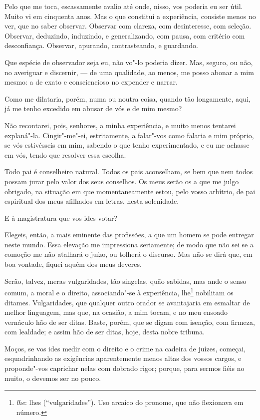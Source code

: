 Pelo que me toca, escassamente avalio até onde, nisso, vos poderia
eu ser útil. Muito vi em cinquenta anos. Mas o que constitui a
experiência, consiste menos no ver, que no saber observar. Observar com
clareza, com desinteresse, com seleção. Observar, deduzindo, induzindo,
e generalizando, com pausa, com critério com desconfiança. Observar,
apurando, contrasteando, e guardando.

Que espécie de observador seja eu, não vo"-lo poderia dizer. Mas,
seguro, ou não, no averiguar e discernir, --- de uma qualidade, ao menos,
me posso abonar a mim mesmo: a de exato e consciencioso no expender e narrar.

Como me dilataria, porém, numa ou noutra coisa, quando tão
longamente, aqui, já me tenho excedido em abusar de vós e de mim mesmo?

Não recontarei, pois, senhores, a minha experiência, e muito menos
tentarei explaná"-la. Cingir"-me"-ei, estritamente, a falar"-vos como
falaria e mim próprio, se vós estivésseis em mim, sabendo o que tenho
experimentado, e eu me achasse em vós, tendo que resolver essa escolha.

Todo pai é conselheiro natural. Todos os pais aconselham, se bem
que nem todos possam jurar pelo valor dos seus conselhos. Os meus serão
os a que me julgo obrigado, na situação em que momentaneamente estou,
pelo vosso arbítrio, de pai espiritual dos meus afilhados em letras,
nesta solenidade.

E à magistratura que vos ides votar?

Elegeis, então, a mais eminente das profissões, a que um homem se
pode entregar neste mundo. Essa elevação me impressiona seriamente; de
modo que não sei se a comoção me não atalhará o juízo, ou tolherá o
discurso. Mas não se dirá que, em boa vontade, fiquei aquém dos meus deveres.

Serão, talvez, meras vulgaridades, tão singelas, quão sabidas, mas
ande o senso comum, a moral e o direito, associando"-se à experiência,
lhe\footnote{\textit{lhe}: lhes (“vulgaridades”). Uso arcaico do pronome, que não flexionava em número.}
nobilitam os ditames. Vulgaridades, que qualquer outro orador se
avantajaria em esmaltar de melhor linguagem, mas que, na ocasião, a mim
tocam, e no meu ensoado vernáculo hão de ser ditas. Baste, porém, que
se digam com isenção, com firmeza, com lealdade; e assim hão de ser
ditas, hoje, desta nobre tribuna.

Moços, se vos ides medir com o direito e o crime na cadeira de
juízes, começai, esquadrinhando as exigências aparentemente menos altas
dos vossos cargos, e proponde"-vos caprichar nelas com dobrado rigor;
porque, para sermos fiéis no muito, o devemos ser no pouco.

